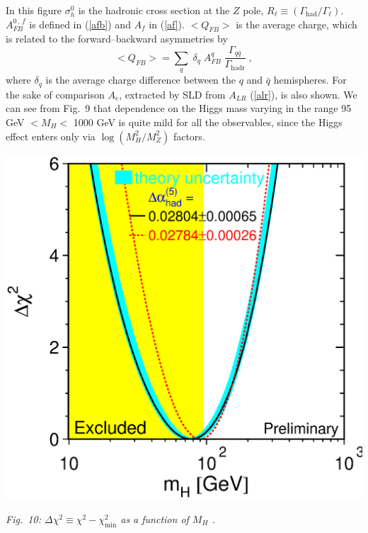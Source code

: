 \documentclass[12pt]{report}
\def\text#1{{\scriptstyle\mathrm{#1}}}
\begin{document}
In this figure $\sigma_h^0$ is the hadronic cross section at the $Z$
pole, $R_\ell \equiv (\Gamma_{\text{had}}/\Gamma_\ell)$. $A_{FB}^{0\,
, \, f}$ is defined in (\ref{afb}) and $A_f$ in (\ref{af}).
$<Q_{FB}>$ is the average charge, which is related to the
forward--backward asymmetries by
\[
< Q_{FB} > = \sum_q \; \delta_q \; A_{FB}^q \;
\frac{ \Gamma_{q\bar{q}}}{\Gamma_{\text{hadr}}} \; ,
\]   
where $\delta_q$ is the average charge difference between the $q$ and
$\bar{q}$ hemispheres. For the sake of comparison $A_e$, extracted by
SLD from $A_{LR}$ (\ref{alr}), is also shown. We can see from Fig.\ 9
that dependence on the Higgs mass varying in the range 95 GeV $< M_H
<$ 1000 GeV is quite mild for all the observables, since the Higgs
effect enters only via $\log(M_H^2/M_Z^2)$ factors.

\begin{center}
\includegraphics[scale=0.45]{fig10.eps}
\end{center}

\begin{center}
\begin{minipage}[h]{12cm}
\begin{center}
{\it Fig.\ 10: $\Delta \chi^2 \equiv \chi^2 - \chi^2_{\text{min}}$ as
a function of $M_H$ \cite{Lep:99,LepSite}.}
\end{center}
\end{minipage}
\end{center}
\end{document}
